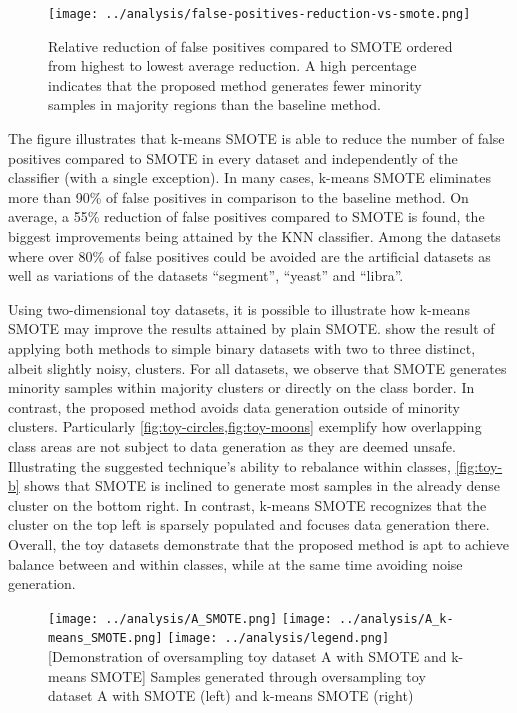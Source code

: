 \documentclass[sort&compress]{elsarticle}
\begin{document}
\begin{figure}[ht]
	\centering
	\texttt{[image: ../analysis/false-positives-reduction-vs-smote.png]}
	\caption[Relative reduction of false positives compared to \acs{SMOTE}]
	{Relative reduction of false positives compared to \acs{SMOTE} ordered from
	highest to lowest average reduction. A high percentage indicates that the
	proposed method generates fewer minority samples in majority regions than
	the baseline method.}
	\label{fig:false_positives_reduction}
\end{figure}

The figure illustrates that k-means \ac{SMOTE} is able to reduce the number of
false positives compared to \ac{SMOTE} in every dataset and independently of the
classifier (with a single exception). In many cases, k-means \ac{SMOTE}
eliminates more than 90\% of false positives in comparison to the baseline
method. On average, a 55\% reduction of false positives compared to \ac{SMOTE}
is found, the biggest improvements being attained by the \ac{KNN} classifier.
Among the datasets where over 80\% of false positives could be avoided are the
artificial datasets as well as variations of the datasets ``segment'', ``yeast''
and ``libra''.

Using two-dimensional toy datasets, it is possible to illustrate how k-means
\ac{SMOTE} may improve the results attained by plain \ac{SMOTE}.
 show the
result of applying both methods to simple binary datasets with two to three
distinct, albeit slightly noisy, clusters. For all datasets, we observe that
\ac{SMOTE} generates minority samples within majority clusters or directly on
the class border. In contrast, the proposed method avoids data generation
outside of minority clusters. Particularly \cref{fig:toy-circles,fig:toy-moons}
exemplify how overlapping class areas are not subject to data generation as they
are deemed unsafe. Illustrating the suggested technique's ability to rebalance
within classes, \cref{fig:toy-b} shows that \ac{SMOTE} is inclined to generate
most samples in the already dense cluster on the bottom right. In contrast,
k-means \ac{SMOTE} recognizes that the cluster on the top left is sparsely
populated and focuses data generation there. Overall, the toy datasets
demonstrate that the proposed method is apt to achieve balance between and
within classes, while at the same time avoiding noise generation.

\begin{figure}[ht]
	\centering
	\texttt{[image: ../analysis/A\_SMOTE.png]}
	\hfill
	\texttt{[image: ../analysis/A\_k-means\_SMOTE.png]}
	\texttt{[image: ../analysis/legend.png]}
	[Demonstration of oversampling toy dataset A with \acs{SMOTE} and k-means \acs{SMOTE}]
	{Samples generated through oversampling toy dataset A with \acs{SMOTE} (left) and k-means \acs{SMOTE} (right)}
	\label{fig:toy-a}
 \end{figure}
\end{document}
